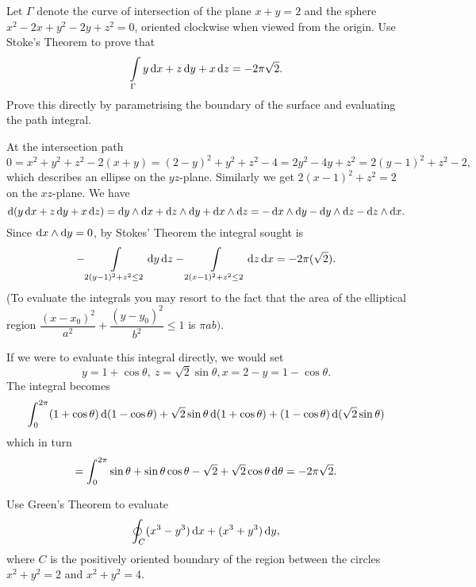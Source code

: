 \begin{problem}
Let $\Gamma$ denote the curve of intersection of the plane $x + y =
2$ and the sphere $x^2 -2x + y^2 - 2y + z^2 = 0$, oriented clockwise
when viewed from the origin. Use Stoke's Theorem to prove that
$$\dint \limits_\Gamma y \d{x} + z\d{y} + x\d{z} = -2\pi\sqrt{2}.
$$ Prove this directly by parametrising the boundary of the
surface and evaluating the path integral. \begin{answer} At the
intersection path
$$ 0 = x^2 + y^2 + z^2 - 2(x + y) = (2 - y)^2 + y^2 + z^2 - 4 = 2y^2 - 4y + z^2 = 2(y - 1)^2 + z^2 - 2,  $$
which describes an ellipse on the $yz$-plane. Similarly we get $2(x
- 1)^2 + z^2 = 2$ on the $xz$-plane.  We have
$$ \d{\left(y\d{x} + z\d{y} + x\d{z}\right)}  = \d{y}\wedge\d{x} +
\d{z}\wedge\d{y} + \d{x}\wedge\d{z} = -\d{x}\wedge\d{y}
-\d{y}\wedge\d{z} - \d{z}\wedge\d{x}.$$ Since $\d{x}\wedge \d{y} =
0$, by Stokes' Theorem the integral sought is
$$ -\dint \limits_{2(y - 1)^2 + z^2 \leq 2} \d{y}\d{z}  -\dint \limits_{2(x- 1)^2 + z^2 \leq 2} \d{z}\d{x}
= -2\pi (\sqrt{2}). $$ (To evaluate the integrals you may resort to
the fact that  the area of the elliptical region
$\dfrac{(x-x_0)^2}{a^2} + \dfrac{(y-y_0)^2}{b^2} \leq 1$ is $\pi
ab)$.

\bigskip

If we were to evaluate this integral directly, we would set $$  y =
1 + \cos \theta, \ z =  \sqrt{2}\sin \theta , x = 2 - y = 1 -
\cos\theta .
$$The integral becomes
$$ \dint _0 ^{2\pi} (1 + \cos \theta)\d{(1 - \cos \theta)} + \sqrt{2}\sin\theta\d{(1 + \cos\theta)} + (1 - \cos\theta)\d{(\sqrt{2}\sin\theta)} $$
which in turn $$ = \dint_0 ^{2\pi} \sin\theta + \sin\theta\cos\theta
- \sqrt{2} + \sqrt{2}\cos\theta \d{\theta} = -2\pi\sqrt{2}.$$
\end{answer}
\end{problem}
\begin{problem}
Use Green's Theorem to evaluate
$$\doint _C (x^3-y^3)\d{x} +(x^3+y^3)\d{y},  $$
where $C$ is the  positively oriented boundary of the region between
the circles $x^2 +y^2 = 2$ and $x^2 +y^2 = 4$.
\end{problem}




